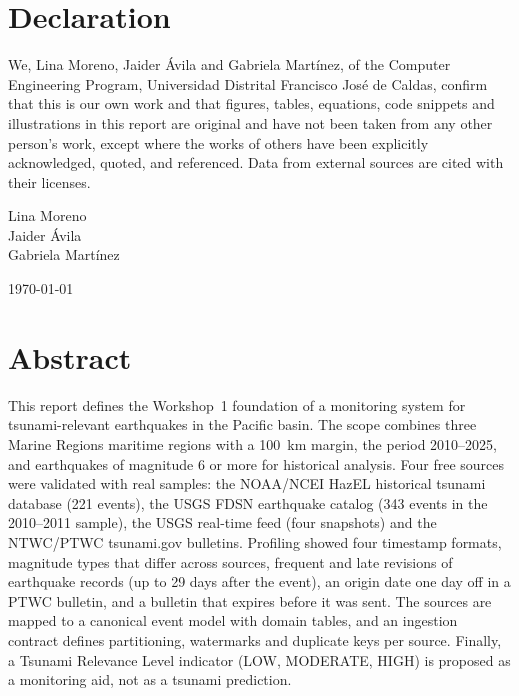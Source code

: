 \documentclass[a4paper,11pt,oneside]{book}
\begin{document}
    \newpage
    \thispagestyle{empty}
    \chapter*{\Large Declaration}
    We, Lina Moreno, Jaider \'Avila and Gabriela Mart\'inez, of the Computer Engineering Program, Universidad Distrital Francisco Jos\'e de Caldas, confirm that this is our own work and that figures, tables, equations, code snippets and illustrations in this report are original and have not been taken from any other person's work, except where the works of others have been explicitly acknowledged, quoted, and referenced. Data from external sources are cited with their licenses.
    ~\\[1cm]
    \begin{flushright}
    Lina Moreno\\
    Jaider \'Avila\\
    Gabriela Mart\'inez

    \today
    \end{flushright}

    \chapter*{Abstract}
    This report defines the Workshop~1 foundation of a monitoring system for tsunami-relevant earthquakes in the Pacific basin.
The scope combines three Marine Regions maritime regions with a 100~km margin, the period 2010--2025, and earthquakes of magnitude 6 or more for historical analysis.
Four free sources were validated with real samples: the NOAA/NCEI HazEL historical tsunami database (221 events), the USGS FDSN earthquake catalog (343 events in the 2010--2011 sample), the USGS real-time feed (four snapshots) and the NTWC/PTWC tsunami.gov bulletins.
Profiling showed four timestamp formats, magnitude types that differ across sources, frequent and late revisions of earthquake records (up to 29 days after the event), an origin date one day off in a PTWC bulletin, and a bulletin that expires before it was sent.
The sources are mapped to a canonical event model with domain tables, and an ingestion contract defines partitioning, watermarks and duplicate keys per source.
Finally, a Tsunami Relevance Level indicator (LOW, MODERATE, HIGH) is proposed as a monitoring aid, not as a tsunami prediction.
\end{document}
